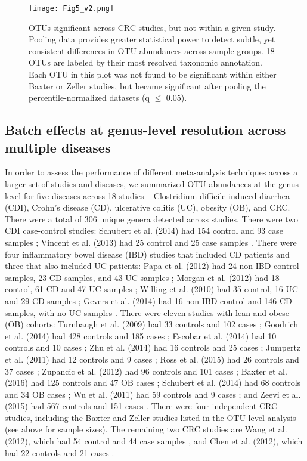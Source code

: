 \begin{figure}[h]
\begin{center}
    \texttt{[image: Fig5\_v2.png]}
    \caption{OTUs significant across CRC studies, but not within a given study. Pooling data provides greater statistical power to detect subtle, yet consistent differences in OTU abundances across sample groups. 18 OTUs are labeled by their most resolved taxonomic annotation. Each OTU in this plot was not found to be significant within either Baxter or Zeller studies, but became significant after pooling the percentile-normalized datasets (q $\leq$ 0.05).}\label{percnorm:fig5}
\end{center}
\end{figure}

\subsection{Batch effects at genus-level resolution across multiple diseases}

In order to assess the performance of different meta-analysis techniques across a larger set of studies and diseases, we summarized OTU abundances at the genus level for five diseases across 18 studies -- Clostridium difficile induced diarrhea (CDI), Crohn's disease (CD), ulcerative colitis (UC), obesity (OB), and CRC.
There were a total of 306 unique genera detected across studies. There were two CDI case-control studies: Schubert et al. (2014) had 154 control and 93 case samples \cite{33}; Vincent et al. (2013) had 25 control and 25 case samples \cite{36}.
There were four inflammatory bowel disease (IBD) studies that included CD patients and three that also included UC patients: Papa et al. (2012) had 24 non-IBD control samples, 23 CD samples, and 43 UC samples \cite{23}; Morgan et al. (2012) had 18 control, 61 CD and 47 UC samples \cite{24}; Willing et al. (2010) had 35 control, 16 UC and 29 CD samples \cite{25}; Gevers et al. (2014) had 16 non-IBD control and 146 CD samples, with no UC samples \cite{22}.
There were eleven studies with lean and obese (OB) cohorts: Turnbaugh et al. (2009) had 33 controls and 102 cases \cite{26}; Goodrich et al. (2014) had 428 controls and 185 cases \cite{30}; Escobar et al. (2014) had 10 controls and 10 cases \cite{27}; Zhu et al. (2014) had 16 controls and 25 cases \cite{44}; Jumpertz et al. (2011) had 12 controls and 9 cases \cite{34}; Ross et al. (2015) had 26 controls and 37 cases \cite{29}; Zupancic et al. (2012) had 96 controls and 101 cases \cite{28}; Baxter et al. (2016) had 125 controls and 47 OB cases \cite{18}; Schubert et al. (2014) had 68 controls and 34 OB cases \cite{33}; Wu et al. (2011) had 59 controls and 9 cases \cite{32}; and Zeevi et al. (2015) had 567 controls and 151 cases \cite{31}.
There were four independent CRC studies, including the Baxter and Zeller studies listed in the OTU-level analysis (see above for sample sizes).
The remaining two CRC studies are Wang et al. (2012), which had 54 control and 44 case samples \cite{45}, and Chen et al. (2012), which had 22 controls and 21 cases \cite{21}.

